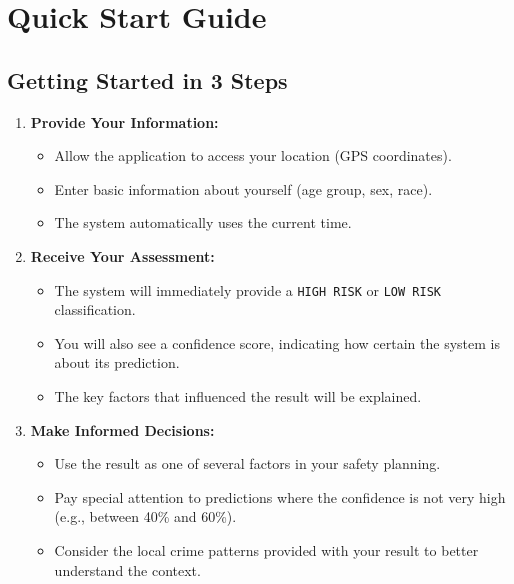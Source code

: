 \documentclass[11pt]{article}
\begin{document}
\section{Quick Start Guide}

\subsection{Getting Started in 3 Steps}
\begin{enumerate}
\item \textbf{Provide Your Information:}
  \begin{itemize}
  \item Allow the application to access your location (GPS coordinates).
  \item Enter basic information about yourself (age group, sex, race).
  \item The system automatically uses the current time.
  \end{itemize}

\item \textbf{Receive Your Assessment:}
  \begin{itemize}
  \item The system will immediately provide a \texttt{HIGH RISK} or \texttt{LOW RISK} classification.
  \item You will also see a confidence score, indicating how certain the system is about its prediction.
  \item The key factors that influenced the result will be explained.
  \end{itemize}

\item \textbf{Make Informed Decisions:}
  \begin{itemize}
  \item Use the result as one of several factors in your safety planning.
  \item Pay special attention to predictions where the confidence is not very high (e.g., between 40\% and 60\%).
  \item Consider the local crime patterns provided with your result to better understand the context.
  \end{itemize}
\end{enumerate}
\end{document}
